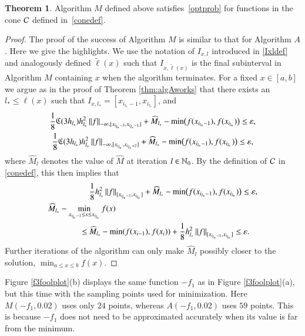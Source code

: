 \documentclass[review]{elsarticle}
\newcommand{\abstol}{\varepsilon}
\theoremstyle{definition}
\newcommand{\tell}{\tilde{\ell}}
\newcommand{\hM}{\widehat{M}}
\newtheorem{theorem}{Theorem}
\newcommand{\minfii}{\min(f(x_{i-1}), f(x_i))} %
\begin{document}
\begin{theorem} \label{thm:algMworks}
Algorithm $M$ defined above satisfies~\eqref{optprob} for functions in the
cone $\mathcal{C}$ defined in~\eqref{conedef}.
\end{theorem}

\begin{proof}
	The proof of the success of Algorithm $M$ is similar to that for Algorithm $A$. Here
	we give the highlights.     We use the notation of $I_{x,l}$ introduced in \eqref{Ixldef}
	and analogously defined $\tell(x)$ such that $I_{x,\tell(x)}$ is the final subinterval in
	Algorithm $M$ containing $x$ when the algorithm terminates.   For a fixed $x \in
	[a,b]$ we argue as in the proof of Theorem \ref{thm:algAworks} that there exists an
	$l_{*} \le \ell(x)$ such that $I_{x,l_*} =[x_{i_{l_*}-1},x_{i_{l_*}}]$, and
	\begin{gather*}
	\frac{1} 8 \fC(3h_{l_*}) h_{l_*}^2 \norm[-\infty,{[x_{i_{l_*}-3},x_{i_{l_*}-1}]}]{f} + \hM_{l_*}
	-  \min\bigl(f(x_{i_{l_*}-1}),f(x_{i_{l_*}})\bigr)   \le \abstol , \\
	\frac{1} 8 \fC(3h_{l_*}) h_{l_*}^2 \norm[-\infty,{[x_{i_{l_*}},x_{i_{l_*}+2}]}]{f} +  \hM_{l_*}
	-  \min\bigl(f(x_{i_{l_*}-1}),f(x_{i_{l_*}})\bigr)   \le \abstol,
	\end{gather*}
	where $ \hM_{l}$ denotes the value of $\hM$ at iteration $l \in \mathbb{N}_{0}$.  By the
	definition of $\mathcal{C}$ in \eqref{conedef}, this then implies that
	\begin{align}
	\nonumber
	 &	\frac{1}{8} h_{l_*}^2 \norm[{[x_{i_{l_*}-1}, x_{i_{l_*}}]}]{f} + \hM_{l_*} -
	 \min\bigl(f(x_{i_{l_*}-1}),f(x_{i_{l_*}})\bigr)   \le \abstol,
	\\	\MoveEqLeft[5]{\hM_{l_*} - \min_{x_{i_{l_*}-1} \le x \le x_{i_{l_*}}} f(x) } \nonumber
	\\ \le \ & \hM_{l_*}  - \minfii + \frac{1}{8} h_{l_*}^2\norm[{[x_{i_{l_*}-1}, x_{i_{l_*}}]}]{f} \le
	\abstol. \label{herrtogether}
	\end{align}
Further iterations of the algorithm can only make $\hM_{l}$ possibly closer to the
solution, $\min_{a \le x \le b} f(x) $.
\end{proof}

Figure \ref{f3foolplot}(b) displays the same function $-f_1$ as in
Figure \ref{f3foolplot}(a), but this time with the sampling points used for
minimization. Here $M(-f_1,0.02)$ uses only $24$ points, whereas
$A(-f_1,0.02)$ uses $59$ points. This is because $-f_1$ does not need to be
approximated accurately when its value is far from the minimum.
\end{document}

